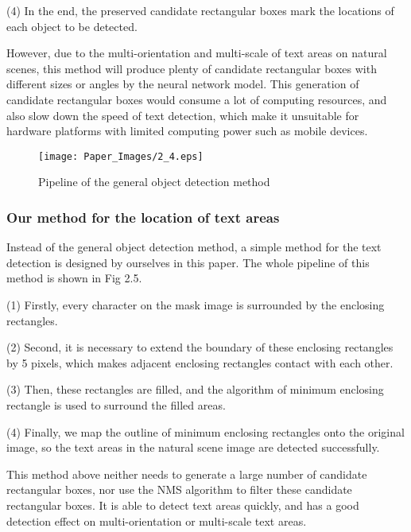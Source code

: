 \documentclass[22pt, UTF8]{article}
\numberwithin{figure}{section}
\numberwithin{table}{section}
\numberwithin{equation}{section} %
\begin{document}
\setlength\parindent{2em} (4) In the end, the preserved candidate rectangular boxes mark the locations of each object to be detected.

\setlength\parindent{2em} However, due to the multi-orientation and multi-scale of text areas on natural scenes, this method will produce plenty of candidate rectangular boxes with different sizes or angles by the neural network model. This generation of candidate rectangular boxes would consume a lot of computing resources, and also slow down the speed of text detection, which make it unsuitable for hardware platforms with limited computing power such as mobile devices.

\begin{figure}[H]
    \centering
        \texttt{[image: Paper\_Images/2\_4.eps]}
    \vspace{-3mm} %
    \caption{Pipeline of the general object detection method}
    \vspace{-4mm} %
\end{figure}

\subsubsection{Our method for the location of text areas}

\setlength\parindent{2em} Instead of the general object detection method, a simple method for the text detection is designed by ourselves in this paper. The whole pipeline of this method is shown in Fig 2.5.

\setlength\parindent{2em} (1) Firstly, every character on the mask image is surrounded by the enclosing rectangles.

\setlength\parindent{2em} (2) Second, it is necessary to extend the boundary of these enclosing rectangles by 5 pixels, which makes adjacent enclosing rectangles contact with each other.

\setlength\parindent{2em} (3) Then, these rectangles are filled, and the algorithm of minimum enclosing rectangle is used to surround the filled areas.

\setlength\parindent{2em} (4) Finally, we map the outline of minimum enclosing rectangles onto the original image, so the text areas in the natural scene image are detected successfully.

\setlength\parindent{2em} This method above neither needs to generate a large number of candidate rectangular boxes, nor use the NMS algorithm to filter these candidate rectangular boxes. It is able to detect text areas quickly, and has a good detection effect on multi-orientation or multi-scale text areas.
\end{document}
